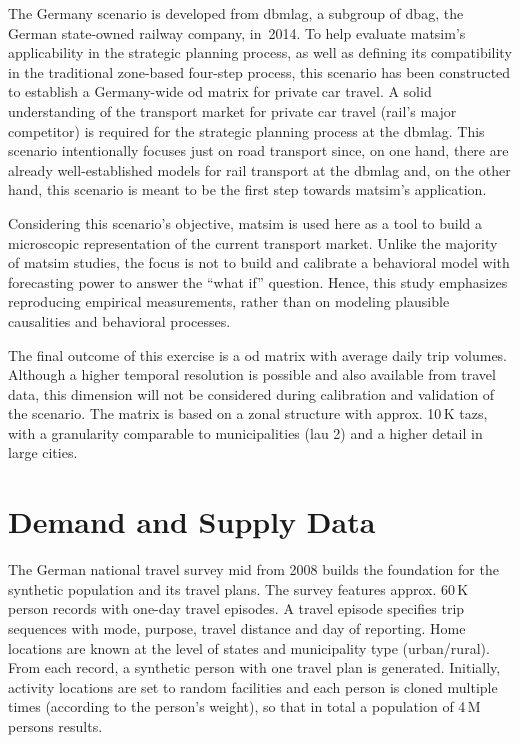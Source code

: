 The Germany scenario is developed from \gls{dbmlag}, a subgroup of \gls{dbag}, the German state-owned railway company, in~2014. To help evaluate \gls{matsim}'s applicability in the strategic planning process, as well as defining its compatibility in the traditional zone-based four-step process, this scenario has been constructed to establish a Germany-wide \gls{od} matrix for private car travel. A solid understanding of the transport market for private car travel (rail's major competitor) is required for the strategic planning process at the \gls{dbmlag}. This scenario intentionally focuses just on road transport since, on one hand, there are already well-established models for rail transport at the \gls{dbmlag} and, on the other hand, this scenario is meant to be the first step towards \gls{matsim}'s application.

Considering this scenario's objective, \gls{matsim} is used here as a tool to build a microscopic representation of the current transport market. Unlike the majority of \gls{matsim} studies, the focus is not to build and calibrate a behavioral model with forecasting power to answer the ``what if'' question. Hence, this study emphasizes reproducing empirical measurements, rather than on modeling plausible causalities and behavioral processes.

The final outcome of this exercise is a \gls{od} matrix with average daily trip volumes. Although a higher temporal resolution is possible and also available from travel data, this dimension will not be considered during calibration and validation of the scenario. The matrix is based on a zonal structure with approx. 10\,K \glspl{taz}, with a granularity comparable to municipalities (\gls{lau} 2) and a higher detail in large cities.

\section{Demand and Supply Data}

The German national travel survey \gls{mid} from 2008 \citep{Follmer2010MiD} builds the foundation for the synthetic population and its travel plans. The survey features approx. 60\,K person records with one-day travel episodes. A travel episode specifies trip sequences with mode, purpose, travel distance and day of reporting. Home locations are known at the level of states and municipality type (urban/rural). From each record, a synthetic person with one travel plan is generated. Initially, activity locations are set to random facilities and each person is cloned multiple times (according to the person's weight), so that in total a population of 4\,M persons results.

